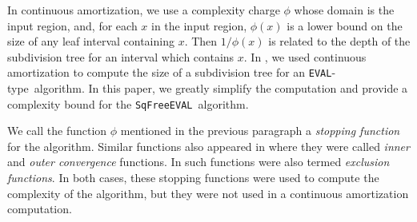 \documentclass{amsart}
\theoremstyle{definition}
\newcommand{\EVAL}{\texttt{SqFreeEVAL}}
\newcommand{\EVALTYPE}{\texttt{EVAL}-type}
\begin{document}
In continuous amortization, we use a complexity charge $\phi$ whose domain is the input region, and, for each $x$ in the input region, $\phi(x)$ is a lower bound on the size of any leaf interval containing $x$.  Then $1/\phi(x)$ is related to the depth of the subdivision tree for an interval which contains $x$.  In \citep{Burr-Krahmer-Yap:integral:09}, we used continuous amortization to compute the size of a subdivision tree for an \EVALTYPE\ algorithm.  In this paper, we greatly simplify the computation and provide a complexity bound for the \EVAL\ algorithm.

We call the function $\phi$ mentioned in the previous paragraph a {\em stopping function} for the algorithm.  Similar functions also appeared in \citep{Henrici:search:70} where they were called {\em inner} and {\em outer convergence} functions.  In \citep{Yakoubsohn:bisection:05} such functions were also termed {\em exclusion functions}.  In both cases, these stopping functions were used to compute the complexity of the algorithm, but they were not used in a continuous amortization computation.
\end{document}
